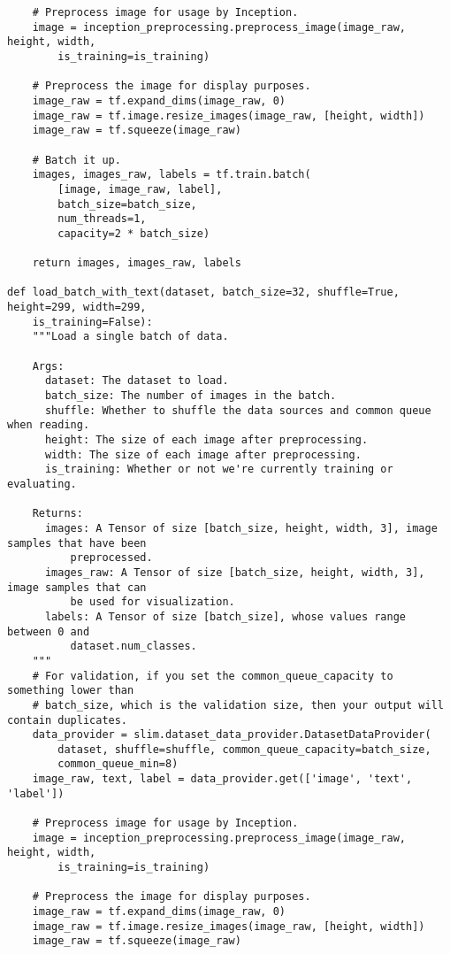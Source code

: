 \begin{lstlisting}
    # Preprocess image for usage by Inception.
    image = inception_preprocessing.preprocess_image(image_raw, height, width, 
        is_training=is_training)

    # Preprocess the image for display purposes.
    image_raw = tf.expand_dims(image_raw, 0)
    image_raw = tf.image.resize_images(image_raw, [height, width])
    image_raw = tf.squeeze(image_raw)

    # Batch it up.
    images, images_raw, labels = tf.train.batch(
        [image, image_raw, label],
        batch_size=batch_size,
        num_threads=1,
        capacity=2 * batch_size)
    
    return images, images_raw, labels

def load_batch_with_text(dataset, batch_size=32, shuffle=True, height=299, width=299, 
    is_training=False):
    """Load a single batch of data. 
    
    Args:
      dataset: The dataset to load.
      batch_size: The number of images in the batch.
      shuffle: Whether to shuffle the data sources and common queue when reading.
      height: The size of each image after preprocessing.
      width: The size of each image after preprocessing.
      is_training: Whether or not we're currently training or evaluating.
    
    Returns:
      images: A Tensor of size [batch_size, height, width, 3], image samples that have been 
          preprocessed.
      images_raw: A Tensor of size [batch_size, height, width, 3], image samples that can 
          be used for visualization.
      labels: A Tensor of size [batch_size], whose values range between 0 and 
          dataset.num_classes.
    """
    # For validation, if you set the common_queue_capacity to something lower than
    # batch_size, which is the validation size, then your output will contain duplicates.
    data_provider = slim.dataset_data_provider.DatasetDataProvider(
        dataset, shuffle=shuffle, common_queue_capacity=batch_size,
        common_queue_min=8)
    image_raw, text, label = data_provider.get(['image', 'text', 'label'])
    
    # Preprocess image for usage by Inception.
    image = inception_preprocessing.preprocess_image(image_raw, height, width, 
        is_training=is_training)

    # Preprocess the image for display purposes.
    image_raw = tf.expand_dims(image_raw, 0)
    image_raw = tf.image.resize_images(image_raw, [height, width])
    image_raw = tf.squeeze(image_raw)


\end{lstlisting}

